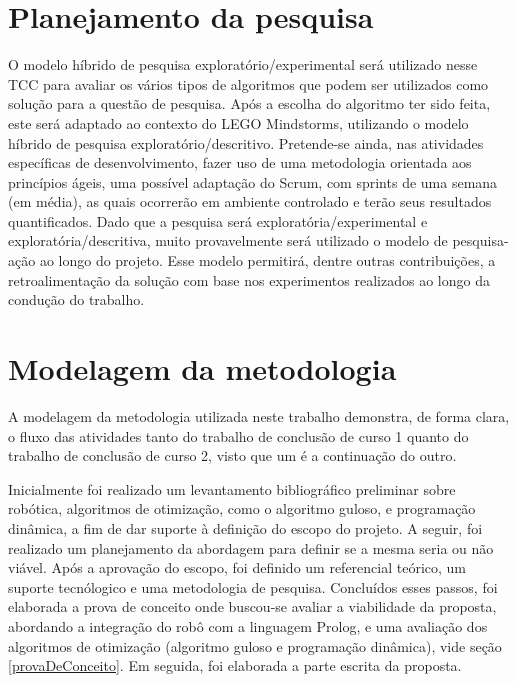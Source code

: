\section{Planejamento da pesquisa}
	O modelo híbrido de pesquisa exploratório/experimental será utilizado nesse TCC para avaliar os vários tipos de algoritmos que podem ser utilizados como solução para a questão de pesquisa. Após a escolha do algoritmo ter sido feita, este será adaptado ao contexto do LEGO Mindstorms, utilizando o modelo híbrido de pesquisa exploratório/descritivo.
Pretende-se ainda, nas atividades específicas de desenvolvimento, fazer uso de uma  metodologia orientada aos princípios ágeis, uma possível adaptação do Scrum, com sprints
de uma semana (em média), as quais ocorrerão em ambiente controlado e terão seus resultados quantificados.
	Dado que a pesquisa será exploratória/experimental e exploratória/descritiva, muito provavelmente será utilizado o modelo de pesquisa-ação ao longo do projeto. Esse modelo permitirá, dentre outras contribuições, a retroalimentação da solução com base nos experimentos realizados ao longo da condução do trabalho.

\section{Modelagem da metodologia}
	A modelagem da metodologia utilizada neste trabalho demonstra, de forma clara, o fluxo das atividades tanto do trabalho de conclusão de curso 1 quanto do trabalho de conclusão de curso 2, visto que um é a continuação do outro.

Inicialmente foi realizado um levantamento bibliográfico preliminar sobre robótica, algoritmos de otimização, como o algoritmo guloso, e programação dinâmica, a fim de dar suporte à definição do escopo do projeto. A seguir, foi realizado um planejamento da abordagem para definir se a mesma seria ou não viável. Após a aprovação do escopo, foi definido um referencial teórico, um suporte tecnólogico e uma metodologia de pesquisa. Concluídos esses passos, foi elaborada a prova de conceito onde buscou-se avaliar a viabilidade da proposta, abordando a integração do robô com a linguagem Prolog, e uma avaliação dos algoritmos de otimização (algoritmo guloso e programação dinâmica), vide seção \ref{provaDeConceito}. Em seguida, foi elaborada a parte escrita da proposta. 

